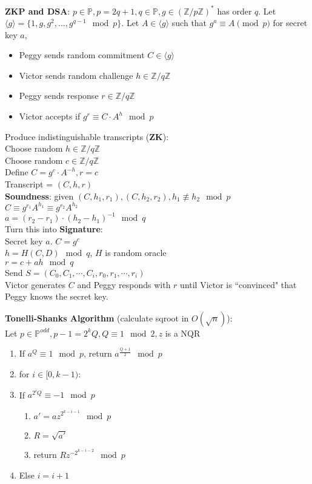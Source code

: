 \documentclass[10pt]{article}
\begin{document}
\begin{multicols}{2}
    \noindent
    \textbf{ZKP and DSA}: $p\in \mathbb{P}, p=2q+1,q\in \mathbb{P}, g\in(\mathbb{Z}/p\mathbb{Z})^*$ has order $q$. Let $\langle g\rangle=\{1,g,g^2,\dots,g^{q-1}\mod p\}$. Let $A\in\langle g\rangle$ such that $g^a \equiv A \pmod p$ for secret key $a$,
    \begin{itemize}
        \item Peggy sends random commitment $C\in\langle g\rangle$
        \item Victor sends random challenge $h\in \mathbb{Z}/q\mathbb{Z}$
        \item Peggy sends response $r\in \mathbb{Z}/q\mathbb{Z}$
        \item Victor accepts if $g^r\equiv C\cdot A^h \mod p$
    \end{itemize}
    Produce indistinguishable transcripts (\textbf{ZK}):\\
    Choose random $h\in \mathbb{Z}/q\mathbb{Z}$\\
    Choose random $c\in \mathbb{Z}/q\mathbb{Z}$\\
    Define $C=g^c\cdot A^{-h}, r=c$\\
    Transcript = $(C,h,r)$\\
    \textbf{Soundness}: given $(C,h_1,r_1), (C,h_2,r_2), h_1\not \equiv h_2 \mod p$\\
    $C \equiv g^{r_1}A^{h_1}\equiv g^{r_2}A^{h_2}$\\
    $a=(r_2-r_1)\cdot(h_2-h_1)^{-1}\mod q$\\
    Turn this into \textbf{Signature}:\\
    Secret key $a$.
    $C=g^c$\\
    $h = H(C,D)\mod q$, $H$ is random oracle\\
    $r = c+ah \mod q$\\
    Send $S=(C_0,C_1,\cdots,C_i,r_0,r_1,\cdots,r_i)$\\
    Victor generates $C$ and Peggy responds with $r$ until Victor is ``convinced" that Peggy knows the secret key.

    \noindent
    \textbf{Tonelli-Shanks Algorithm} (calculate sqroot in $O(\sqrt{n})$):\\
    Let $p\in\mathbb{P}^{odd},p-1=2^kQ,Q\equiv1\mod{2},z$ is a NQR
    \begin{enumerate}
        \item If $a^Q\equiv1\mod{p}$, return $a^{\frac{Q+1}{2}}\mod{p}$
        \item for $i\in[0,k-1)$:
        \item If $a^{2^iQ}\equiv-1\mod{p}$
              \begin{enumerate}
                  \item $a'=az^{2^{k-i-1}}\mod{p}$
                  \item $R=\sqrt{a'}$
                  \item return $Rz^{-2^{k-i-2}}\mod{p}$
              \end{enumerate}
        \item Else $i=i+1$
    \end{enumerate}
\end{multicols}
\end{document}
